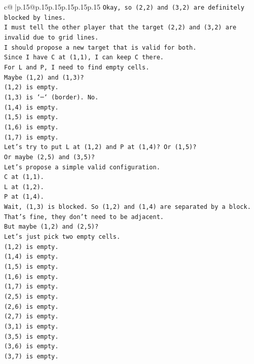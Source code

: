 \documentclass{article}
\begin{document}
{\begin{supertabular}{c@{$\;$}|p{.15\linewidth}@{}p{.15\linewidth}p{.15\linewidth}p{.15\linewidth}p{.15\linewidth}p{.15\linewidth}}
{{{\texttt{Okay, so (2,2) and (3,2) are definitely blocked by lines.} \\
\texttt{I must tell the other player that the target (2,2) and (3,2) are invalid due to grid lines.} \\
\texttt{I should propose a new target that is valid for both.} \\
\texttt{Since I have C at (1,1), I can keep C there.} \\
\texttt{For L and P, I need to find empty cells.} \\
\texttt{Maybe (1,2) and (1,3)?} \\
\texttt{(1,2) is empty.} \\
\texttt{(1,3) is `─` (border). No.} \\
\texttt{(1,4) is empty.} \\
\texttt{(1,5) is empty.} \\
\texttt{(1,6) is empty.} \\
\texttt{(1,7) is empty.} \\
\texttt{Let's try to put L at (1,2) and P at (1,4)? Or (1,5)?} \\
\texttt{Or maybe (2,5) and (3,5)?} \\
\texttt{Let's propose a simple valid configuration.} \\
\texttt{C at (1,1).} \\
\texttt{L at (1,2).} \\
\texttt{P at (1,4).} \\
\texttt{Wait, (1,3) is blocked. So (1,2) and (1,4) are separated by a block. That's fine, they don't need to be adjacent.} \\
\texttt{But maybe (1,2) and (2,5)?} \\
\texttt{Let's just pick two empty cells.} \\
\texttt{(1,2) is empty.} \\
\texttt{(1,4) is empty.} \\
\texttt{(1,5) is empty.} \\
\texttt{(1,6) is empty.} \\
\texttt{(1,7) is empty.} \\
\texttt{(2,5) is empty.} \\
\texttt{(2,6) is empty.} \\
\texttt{(2,7) is empty.} \\
\texttt{(3,1) is empty.} \\
\texttt{(3,5) is empty.} \\
\texttt{(3,6) is empty.} \\
\texttt{(3,7) is empty.} \\
}}}
\end{supertabular}}
\end{document}
